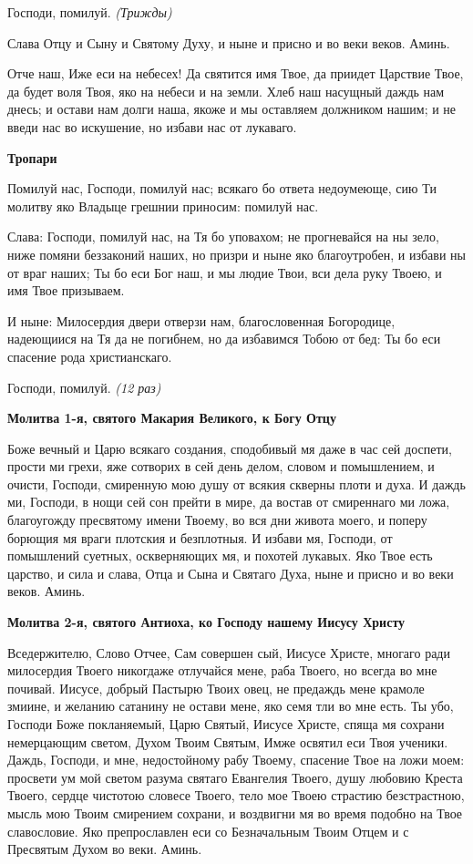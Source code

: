Господи, помилуй. \itshape (Трижды)\normalfont{}


Слава Отцу и Сыну и Святому Духу, и ныне и присно и во веки веков. Аминь.





Отче наш, Иже еси на небесех! Да святится имя Твое, да приидет Царствие Твое, да будет воля Твоя, яко на небеси и на земли. Хлеб наш насущный даждь нам днесь; и остави нам долги наша, якоже и мы оставляем должником нашим; и не введи нас во искушение, но избави нас от лукаваго.


\medskip
\bfseries Тропари\normalfont{}\nopagebreak


Помилуй нас, Господи, помилуй нас; всякаго бо ответа недоумеюще, сию Ти молитву яко Владыце грешнии приносим: помилуй нас.


Слава: Господи, помилуй нас, на Тя бо уповахом; не прогневайся на ны зело, ниже помяни беззаконий наших, но призри и ныне яко благоутробен, и избави ны от враг наших; Ты бо еси Бог наш, и мы людие Твои, вси дела руку Твоею, и имя Твое призываем.


И ныне: Милосердия двери отверзи нам, благословенная Богородице, надеющиися на Тя да не погибнем, но да избавимся Тобою от бед: Ты бо еси спасение рода христианскаго.


Господи, помилуй. \itshape (12 раз)\normalfont{}


\medskip
\bfseries Молитва 1-я, святого Макария Великого, к Богу Отцу\normalfont{}\nopagebreak


Боже вечный и Царю всякаго создания, сподобивый мя даже в час сей доспети, прости ми грехи, яже сотворих в сей день делом, словом и помышлением, и очисти, Господи, смиренную мою душу от всякия скверны плоти и духа. И даждь ми, Господи, в нощи сей сон прейти в мире, да востав от смиреннаго ми ложа, благоугожду пресвятому имени Твоему, во вся дни живота моего, и поперу борющия мя враги плотския и безплотныя. И избави мя, Господи, от помышлений суетных, оскверняющих мя, и похотей лукавых. Яко Твое есть царство, и сила и слава, Отца и Сына и Святаго Духа, ныне и присно и во веки веков. Аминь.


\medskip
\bfseries Молитва 2-я, святого Антиоха, ко Господу нашему Иисусу Христу\normalfont{}\nopagebreak


Вседержителю, Слово Отчее, Сам совершен сый, Иисусе Христе, многаго ради милосердия Твоего никогдаже отлучайся мене, раба Твоего, но всегда во мне почивай. Иисусе, добрый Пастырю Твоих овец, не предаждь мене крамоле змиине, и желанию сатанину не остави мене, яко семя тли во мне есть. Ты убо, Господи Боже покланяемый, Царю Святый, Иисусе Христе, спяща мя сохрани немерцающим светом, Духом Твоим Святым, Имже освятил еси Твоя ученики. Даждь, Господи, и мне, недостойному рабу Твоему, спасение Твое на ложи моем: просвети ум мой светом разума святаго Евангелия Твоего, душу любовию Креста Твоего, сердце чистотою словесе Твоего, тело мое Твоею страстию безстрастною, мысль мою Твоим смирением сохрани, и воздвигни мя во время подобно на Твое славословие. Яко препрославлен еси со Безначальным Твоим Отцем и с Пресвятым Духом во веки. Аминь.




